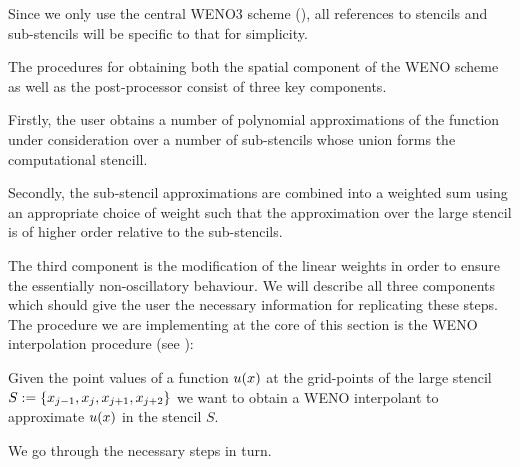 \documentclass{amsart}
\theoremstyle{definition}
\theoremstyle{remark}
\numberwithin{equation}{section}
\begin{document}
Since we only use the central WENO3 scheme (\cite{shu1988efficient}), all references to stencils and sub-stencils will be specific to that for simplicity.
	
	
	The procedures for obtaining both the spatial component of the WENO scheme as well as the post-processor  consist of three key components. 
	
	 Firstly, the user obtains a number of polynomial approximations of the function under consideration over a number of sub-stencils whose union forms the computational stencill.
	 
	  Secondly, the sub-stencil approximations are combined into a weighted sum using an appropriate choice of weight such that the approximation over the large stencil is of higher order relative to the sub-stencils.  
	  
	  The third component is the modification of the linear weights in order to ensure the essentially non-oscillatory behaviour. We will describe all three components which should give the user the necessary information for replicating these steps.  The procedure we are implementing at the core of this section is the WENO interpolation procedure (see \cite[\S2.1]{liu2009positivity}):
	  
	  \begin{Defn}
	  	Given the point values of a function $u\!\left({x}\right)$ at the grid-points of the large stencil $S:=\left\lbrace x_{j-1}, x_j, x_{j+1}, x_{j+2}\right\rbrace$ we want to obtain a WENO interpolant to approximate  $u\!\left({x}\right)$ in the stencil $S$.
	  \end{Defn}
	  We go through the necessary steps in turn.
	
\end{document}
